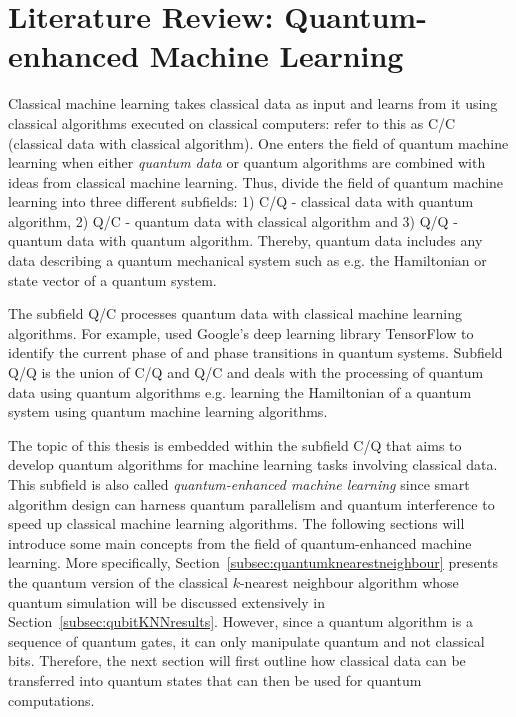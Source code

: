 \chapter{Literature Review: Quantum-enhanced Machine Learning}\label{sec:qml}

Classical machine learning takes classical data as input and learns from it using classical algorithms executed on classical computers:  refer to this as C/C (classical data with classical algorithm). One enters the field of quantum machine learning when either \emph{quantum data} or quantum algorithms are combined with ideas from classical machine learning. Thus,  divide the field of quantum machine learning into three different subfields: 1) C/Q - classical data with quantum algorithm, 2) Q/C - quantum data with classical algorithm and 3) Q/Q - quantum data with quantum algorithm. Thereby, quantum data includes any data describing a quantum mechanical system such as e.g. the Hamiltonian or state vector of a quantum system.

The subfield Q/C processes quantum data with classical machine learning algorithms. For example,  used Google's deep learning library TensorFlow to identify the current phase of and phase transitions in quantum systems. Subfield Q/Q  is the union of C/Q and Q/C and deals with the processing of quantum data using quantum algorithms e.g. learning the Hamiltonian of a quantum system using quantum machine learning algorithms.

The topic of this thesis is embedded within the subfield C/Q that aims to develop quantum algorithms for machine learning tasks involving classical data. This subfield is also called \emph{quantum-enhanced machine learning} since smart algorithm design can harness quantum parallelism and quantum interference to speed up classical machine learning algorithms. The following sections will introduce some main concepts from the field of quantum-enhanced machine learning. More specifically, Section~\ref{subsec:quantumknearestneighbour} presents the quantum version of the classical $k$-nearest neighbour algorithm whose quantum simulation will be discussed extensively in Section~\ref{subsec:qubitKNNresults}. However, since a quantum algorithm is a sequence of quantum gates, it can only manipulate quantum and not classical bits. Therefore, the next section will first outline how classical data can be transferred into quantum states that can then be used for quantum computations.

